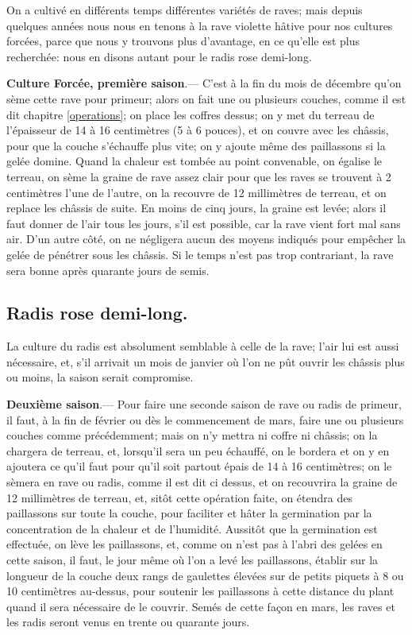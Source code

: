 \documentclass[10pt,a4paper]{book}
\begin{document}
On a cultivé en différents temps différentes variétés de raves; mais depuis quelques années nous nous en tenons à la rave violette hâtive pour nos cultures forcées, parce que nous y trouvons plus d'avantage, en ce qu'elle est plus recherchée: nous en disons autant pour le radis rose demi-long.

\textbf{Culture Forcée, première saison}.--- C'est à la fin du mois de décembre qu'on sème cette rave pour primeur; alors on fait une ou plusieurs couches, comme il est dit chapitre \ref{operations}; on place les coffres dessus; on y met du terreau de l'épaisseur de 14 à 16 centimètres (5 à 6 pouces), et on couvre avec les châssis, pour que la couche s'échauffe plus vite; on y ajoute même des paillassons si la gelée domine. Quand la chaleur est tombée au point convenable, on égalise le terreau, on sème la graine de rave assez clair pour que les raves se trouvent à 2 centimètres l'une de l'autre, on la recouvre de 12 millimètres de terreau, et on replace les châssis de suite. En moins de cinq jours, la graine est levée; alors il faut donner de l'air tous les jours, s'il est possible, car la rave vient fort mal sans air. D'un autre côté, on ne négligera aucun des moyens indiqués pour empêcher la gelée de pénétrer sous les châssis. Si le temps n'est pas trop contrariant, la rave sera bonne après quarante jours de semis.

\subsection{Radis rose demi-long.}

La culture du radis est absolument semblable à celle de la rave; l'air lui est aussi nécessaire, et, s'il arrivait un mois de janvier où l'on ne pût ouvrir les châssis plus ou moins, la saison serait compromise.

\textbf{Deuxième saison}.--- Pour faire une seconde saison de rave ou radis de primeur, il faut, à la fin de février ou dès le commencement de mars, faire une ou plusieurs couches comme précédemment; mais on n'y mettra ni coffre ni châssis; on la chargera de terreau, et, lorsqu'il sera un peu échauffé, on le bordera et on y en ajoutera ce qu'il faut pour qu'il soit partout épais de 14 à 16 centimètres; on le sèmera en rave ou radis, comme il est dit ci dessus, et on recouvrira la graine de 12 millimètres de terreau, et, sitôt cette opération faite, on étendra des paillassons sur toute la couche, pour faciliter et hâter la germination par la concentration de la chaleur et de l'humidité. Aussitôt que la germination est effectuée, on lève les paillassons, et, comme on n'est pas à l'abri des gelées en cette saison, il faut, le jour même où l'on a levé les paillassons, établir sur la longueur de la couche deux rangs de gaulettes élevées sur de petits piquets à 8 ou 10 centimètres au-dessus, pour soutenir les paillassons à cette distance du plant quand il sera nécessaire de le couvrir. Semés de cette façon en mars, les raves et les radis seront venus en trente ou quarante jours.
\end{document}
